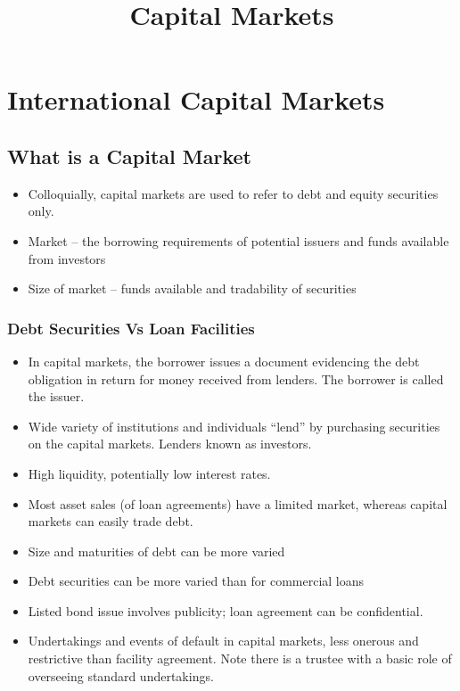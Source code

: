 \documentclass[
]{article}
\title{Capital Markets}
\author{}
\date{}
\providecommand{\tightlist}{%
  \setlength{\itemsep}{0pt}\setlength{\parskip}{0pt}}
\begin{document}
\maketitle

{
\setcounter{tocdepth}{3}
\tableofcontents
}
\hypertarget{international-capital-markets}{%
\section{International Capital
Markets}\label{international-capital-markets}}

\hypertarget{what-is-a-capital-market}{%
\subsection{What is a Capital Market}\label{what-is-a-capital-market}}

\begin{itemize}
\tightlist
\item
  Colloquially, capital markets are used to refer to debt and equity
  securities only.
\item
  Market -- the borrowing requirements of potential issuers and funds
  available from investors
\item
  Size of market -- funds available and tradability of securities
\end{itemize}

\hypertarget{debt-securities-vs-loan-facilities}{%
\subsubsection{Debt Securities Vs Loan
Facilities}\label{debt-securities-vs-loan-facilities}}

\begin{itemize}
\tightlist
\item
  In capital markets, the borrower issues a document evidencing the debt
  obligation in return for money received from lenders. The borrower is
  called the issuer.
\item
  Wide variety of institutions and individuals ``lend'' by purchasing
  securities on the capital markets. Lenders known as investors.
\item
  High liquidity, potentially low interest rates.
\item
  Most asset sales (of loan agreements) have a limited market, whereas
  capital markets can easily trade debt.
\item
  Size and maturities of debt can be more varied
\item
  Debt securities can be more varied than for commercial loans
\item
  Listed bond issue involves publicity; loan agreement can be
  confidential.
\item
  Undertakings and events of default in capital markets, less onerous
  and restrictive than facility agreement. Note there is a trustee with
  a basic role of overseeing standard undertakings.
\end{itemize}
\end{document}
